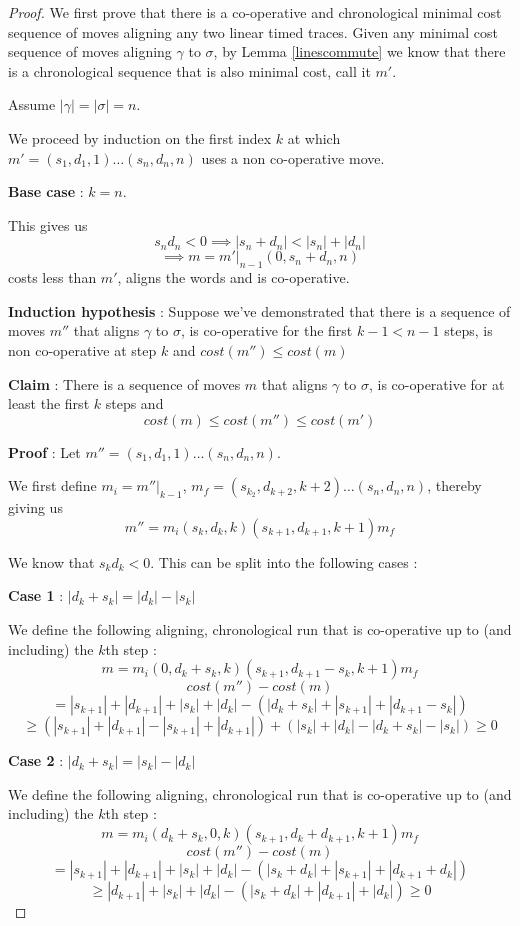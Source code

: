 \documentclass[conference]{IEEEtran}
\newcounter{cases}
\begin{document}
\begin{proof}
We first prove that there is a co-operative and chronological minimal cost sequence of moves aligning any two linear timed traces. 
Given any minimal cost sequence of moves aligning $\gamma$ to $\sigma$, by Lemma \ref{linescommute} we know that there is a chronological sequence that is also minimal cost, call it $m'$. 

Assume $|\gamma| = |\sigma| = n$. 

We proceed by induction on the first index $k$ at which $m' = (s_1, d_1, 1)\dots(s_n, d_n, n)$ uses a non co-operative move. 

\textbf{Base case} : $k = n$.

This gives us $$s_n d_n < 0 \implies |s_n + d_n| < |s_n| + |d_n|$$ 
$$\implies m = m'|_{n-1}(0, s_n + d_n, n)$$ costs less than $m'$, aligns the words and is co-operative. 

\textbf{Induction hypothesis} : Suppose we've demonstrated that there is a sequence of moves $m''$ that aligns $\gamma$ to $\sigma$, is co-operative for the first $k-1 < n-1$ steps, is non co-operative at step $k$ and $cost(m'') \leq cost(m)$

\textbf{Claim} : There is a sequence of moves $m$ that aligns $\gamma$ to $\sigma$, is co-operative for at least the first $k$ steps and $$cost(m) \leq cost(m'') \leq cost(m')$$

\textbf{Proof} : Let $m'' = (s_1, d_1, 1)\dots(s_n, d_n, n)$. 

We first define $m_i = m''|_{k-1}$, $m_f = (s_{k_2}, d_{k+2}, k+2)\dots (s_n, d_n, n)$, thereby giving us $$m'' = m_i(s_k, d_k, k)(s_{k+1}, d_{k+1}, k+1)m_f$$

We know that $s_kd_k < 0$. 
This can be split into the following cases : 

\textbf{Case 1} : $|d_k + s_k| = |d_k| - |s_k|$

We define the following aligning, chronological run that is co-operative up to (and including) the $k$th step : 
$$m = m_i( 0, d_k + s_k, k)( s_{k+1}, d_{k+1} - s_k, k+1)m_f$$
$$cost(m'') - cost(m)  $$$$ = |s_{k+1}| + |d_{k+1}| + |s_k| + |d_k| - ( | d_k + s_k| + | s_{k+1}| + | d_{k+1} - s_k |) $$ $$\geq (|s_{k+1}| + |d_{k+1}|  - |s_{k+1}| + | d_{k+1}|  )+ (  |s_k| + |d_k|  -| d_k + s_k|  -|s_k |)   \geq 0$$

\textbf{Case 2} : $|d_k + s_k| = |s_k| - |d_k|$

We define the following aligning, chronological run that is co-operative up to (and including) the $k$th step : 
$$m = m_i( d_k + s_k, 0, k)( s_{k+1}, d_k + d_{k+1}, k+1)m_f$$
$$cost(m'') - cost(m) $$$$= |s_{k+1}| + |d_{k+1}| + |s_k| + |d_k| - (|s_k + d_k | + | s_{k+1}| + | d_{k+1} + d_k |) $$
$$\geq |d_{k+1}| + |s_k| + |d_k| - (|s_k + d_k | + | d_{k+1}| + |d_k |) \geq 0$$


\end{proof}
\end{document}

